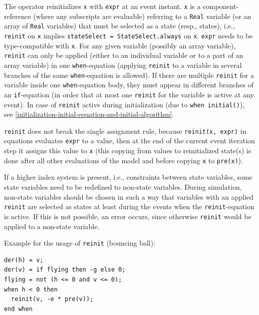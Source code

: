 The operator reinitializes \lstinline!x! with \lstinline!expr! at an event instant.
\lstinline!x! is a component-reference (where any subscripts are evaluable) referring to a \lstinline!Real! variable (or an array of \lstinline!Real! variables) that must be selected as a state (resp., states), i.e., \lstinline!reinit! on \lstinline!x! implies \lstinline!stateSelect = StateSelect.always! on \lstinline!x!.
\lstinline!expr! needs to be type-compatible with \lstinline!x!.
For any given variable (possibly an array variable), \lstinline!reinit! can only be applied (either to an individual variable or to a part of an array variable) in one \lstinline!when!-equation (applying \lstinline!reinit! to a variable in several branches of the same \lstinline!when!-equation is allowed).
If there are multiple \lstinline!reinit! for a variable inside one \lstinline!when!-equation body, they must appear in different branches of an \lstinline!if!-equation (in order that at most one \lstinline!reinit! for the variable is active at any event).
In case of \lstinline!reinit! active during initialization (due to \lstinline!when initial()!), see \cref{initialization-initial-equation-and-initial-algorithm}.

\lstinline!reinit! does not break the single assignment rule, because \lstinline!reinit(x, expr)! in equations evaluates \lstinline!expr! to a value, then at the end of the current event iteration step it assigns this value to \lstinline!x! (this copying from values to reinitialized state(s) is done after all other evaluations of the model and before copying \lstinline!x! to \lstinline!pre(x)!).

\begin{example}
If a higher index system is present, i.e., constraints between state variables, some state variables need to be redefined to non-state variables.
During simulation, non-state variables should be chosen in such a way that variables with an applied \lstinline!reinit! are selected as states at least during the events when the \lstinline!reinit!-equation is active.
If this is not possible, an error occurs, since otherwise \lstinline!reinit! would be applied to a non-state variable.

Example for the usage of \lstinline!reinit! (bouncing ball):
\begin{lstlisting}[language=modelica]
der(h) = v;
der(v) = if flying then -g else 0;
flying = not (h <= 0 and v <= 0);
when h < 0 then
  reinit(v, -e * pre(v));
end when
\end{lstlisting}
\end{example}


